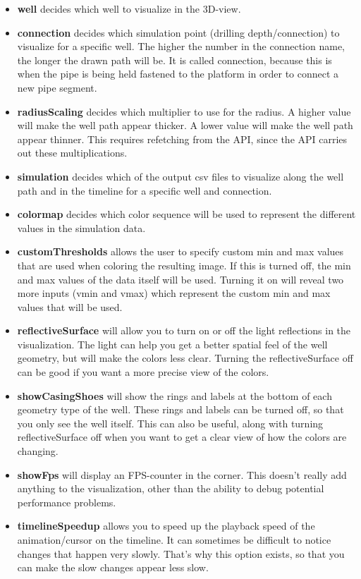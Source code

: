\begin{itemize}
\item
  \textbf{well} decides which well to visualize in the 3D-view.
\item
  \textbf{connection} decides which simulation point (drilling
  depth/connection) to visualize for a specific well. The higher the
  number in the connection name, the longer the drawn path will be. It
  is called connection, because this is when the pipe is being held
  fastened to the platform in order to connect a new pipe segment.
\item
  \textbf{radiusScaling} decides which multiplier to use for the radius.
  A higher value will make the well path appear thicker. A lower value
  will make the well path appear thinner. This requires refetching from
  the API, since the API carries out these multiplications.
\item
  \textbf{simulation} decides which of the output csv files to visualize
  along the well path and in the timeline for a specific well and
  connection.
\item
  \textbf{colormap} decides which color sequence will be used to
  represent the different values in the simulation data.
\item
  \textbf{customThresholds} allows the user to specify custom min and
  max values that are used when coloring the resulting image. If this is
  turned off, the min and max values of the data itself will be used.
  Turning it on will reveal two more inputs (vmin and vmax) which
  represent the custom min and max values that will be used.
\item
  \textbf{reflectiveSurface} will allow you to turn on or off the light
  reflections in the visualization. The light can help you get a better
  spatial feel of the well geometry, but will make the colors less
  clear. Turning the reflectiveSurface off can be good if you want a
  more precise view of the colors.
\item
  \textbf{showCasingShoes} will show the rings and labels at the bottom
  of each geometry type of the well. These rings and labels can be
  turned off, so that you only see the well itself. This can also be
  useful, along with turning reflectiveSurface off when you want to get
  a clear view of how the colors are changing.
\item
  \textbf{showFps} will display an FPS-counter in the corner. This
  doesn't really add anything to the visualization, other than the
  ability to debug potential performance problems.
\item
  \textbf{timelineSpeedup} allows you to speed up the playback speed of
  the animation/cursor on the timeline. It can sometimes be difficult to
  notice changes that happen very slowly. That's why this option exists,
  so that you can make the slow changes appear less slow.
\end{itemize}

